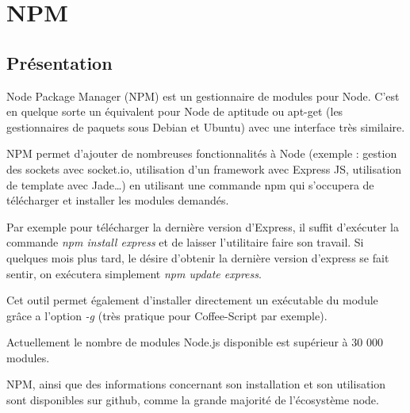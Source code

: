 \section{NPM}
\label{ch:npm}

\subsection{Présentation}

Node Package Manager (NPM) est un gestionnaire de modules pour Node. C'est en quelque sorte un équivalent pour Node de aptitude ou apt-get (les gestionnaires de paquets sous Debian et Ubuntu) avec une interface très similaire. 

NPM permet d’ajouter de nombreuses fonctionnalités à Node (exemple : gestion des sockets avec socket.io, utilisation d’un framework avec Express JS, utilisation de template avec Jade…) en utilisant une commande npm qui s’occupera de télécharger et installer les modules demandés.

Par exemple pour télécharger la dernière version d'Express, il suffit d'exécuter la commande \textit{npm install express} et de laisser l'utilitaire faire son travail. Si quelques mois plus tard, le désire d’obtenir la dernière version d'express se fait sentir, on exécutera simplement \textit{npm update express}.

Cet outil  permet également d’installer directement un exécutable du module grâce a l’option \textit{-g} (très pratique pour Coffee-Script par exemple).

Actuellement le nombre de modules Node.js disponible est supérieur à 30 000 modules.

NPM, ainsi que des informations concernant son installation et son utilisation sont disponibles sur github, comme la grande majorité de l'écosystème node.




